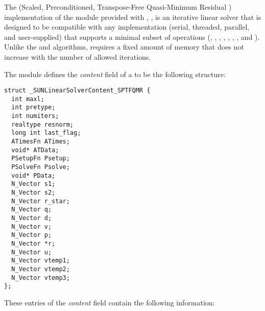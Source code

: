 
The {\sptfqmr} (Scaled, Preconditioned, Transpose-Free Quasi-Minimum
Residual \cite{Fre:93}) implementation of the {\sunlinsol} module 
provided with {\sundials}, {\sunlinsolsptfqmr}, is an iterative linear
solver that is designed to be compatible with any {\nvector}
implementation (serial, threaded, parallel, and user-supplied) that
supports a minimal subset of operations (, 
, , , ,
, , and ).  Unlike the
{\spgmr} and {\spfgmr} algorithms, {\sptfqmr} requires a fixed amount of
memory that does not increase with the number of allowed iterations.

The {\sunlinsolsptfqmr} module defines the {\em content} field of a
 to be the following structure:
\begin{verbatim} 
struct _SUNLinearSolverContent_SPTFQMR {
  int maxl;
  int pretype;
  int numiters;
  realtype resnorm;
  long int last_flag;
  ATimesFn ATimes;
  void* ATData;
  PSetupFn Psetup;
  PSolveFn Psolve;
  void* PData;
  N_Vector s1;
  N_Vector s2;
  N_Vector r_star;
  N_Vector q;
  N_Vector d;
  N_Vector v;
  N_Vector p;
  N_Vector *r;
  N_Vector u;
  N_Vector vtemp1;
  N_Vector vtemp2;
  N_Vector vtemp3;
};
\end{verbatim}
These entries of the \emph{content} field contain the following
information:
